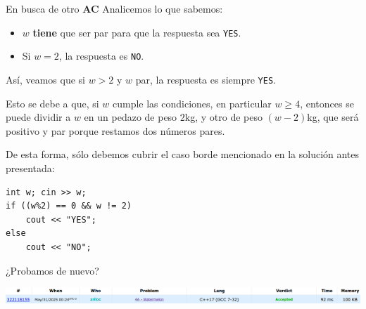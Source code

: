 \documentclass{beamer}
\begin{document}
    \begin{frame}[fragile]{En busca de otro \textbf{AC}}
        Analicemos lo que sabemos: \pause
        \begin{itemize}
            \item $w$ \textbf{tiene} que ser par para que la respuesta sea \texttt{YES}. \pause
            \item Si $w=2$, la respuesta es \texttt{NO}. \pause
        \end{itemize}

        Así, veamos que si $w>2$ y $w$ par, la respuesta es siempre \texttt{YES}. \pause 

        Esto se debe a que, si $w$ cumple las condiciones, en particular $w \geq 4$, entonces se puede dividir a $w$ en un pedazo de peso $2$kg, y otro de peso $(w-2)$kg, que será positivo y par porque restamos dos números pares. \pause

        De esta forma, sólo debemos cubrir el caso borde mencionado en la solución antes presentada: \pause \vspace{4pt}

        \begin{minipage}{.49\linewidth}
        \begin{verbatim}
int w; cin >> w;
if ((w%2) == 0 && w != 2)
    cout << "YES";
else
    cout << "NO";
        \end{verbatim}
        \end{minipage}\pause
        \begin{minipage}{.49\linewidth}
        \begin{center}
            \LARGE
            ¿Probamos de nuevo?
        \end{center}
        \end{minipage}
        \pause

        \begin{center}
            \includegraphics[width=.95\linewidth]{./cf_ac.png}
        \end{center}
    \end{frame}
\end{document}
